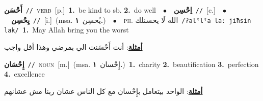 \documentclass[10pt,a4paper,twoside]{article} %
\begin{document}
\begin{multicols}{2}
{\setlength\topsep{0pt}\textbf{\foreignlanguage{arabic}{أَحْسَن}}\ {\color{gray}\texttt{//}\color{black}}\ \textsc{verb}\ [p.]\ \textbf{1.}~be kind to sb.  \textbf{2.}~do well\ \ $\bullet$\ \ \setlength\topsep{0pt}\textbf{\foreignlanguage{arabic}{اِحْسِن}}\ {\color{gray}\texttt{//}\color{black}}\ [c.]\ \ $\bullet$\ \ \setlength\topsep{0pt}\textbf{\foreignlanguage{arabic}{يِحْسِن}}\ {\color{gray}\texttt{//}\color{black}}\ [i.]\ \color{gray}(msa. \foreignlanguage{arabic}{يُحسِن}~\foreignlanguage{arabic}{\textbf{١.}})\color{black}\ \ $\bullet$\ \ \textsc{ph.} \color{gray} \foreignlanguage{arabic}{الله لَا يحسنلك}\color{black}\ {\color{gray}\texttt{/{\sffamily ʔalˤlˤa laː jiħsin lak}/}\color{black}}\ \textbf{1.}~May Allah bring you the worst\  \begin{flushright}\color{gray}\foreignlanguage{arabic}{\textbf{\underline{\foreignlanguage{arabic}{أمثلة}}}: أنت أَحْسَنت الي بمرضي وهذا أقل واجب}\end{flushright}\color{black}} \vspace{2mm}

{\setlength\topsep{0pt}\textbf{\foreignlanguage{arabic}{إِحْسَان}}\ {\color{gray}\texttt{//}\color{black}}\ \textsc{noun}\ [m.]\ \color{gray}(msa. \foreignlanguage{arabic}{إِحْسان}~\foreignlanguage{arabic}{\textbf{١.}})\color{black}\ \textbf{1.}~charity  \textbf{2.}~beautification  \textbf{3.}~perfection  \textbf{4.}~excellence\  \begin{flushright}\color{gray}\foreignlanguage{arabic}{\textbf{\underline{\foreignlanguage{arabic}{أمثلة}}}: الواحد بيتعامل بإِحْسان مع كل الناس عشان ربنا مش عشانهم}\end{flushright}\color{black}} \vspace{2mm}


\end{multicols}
\end{document}
